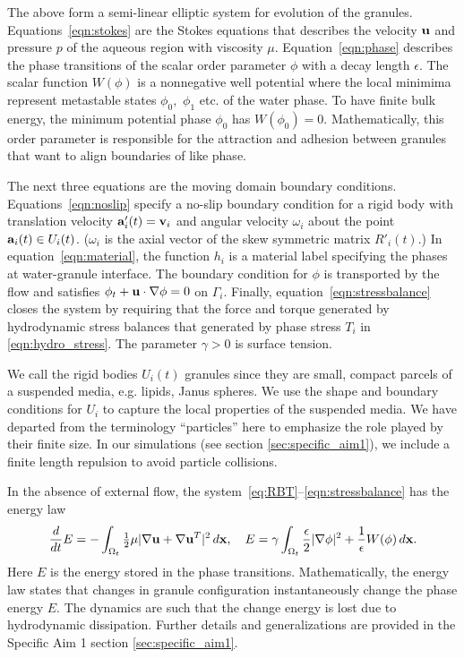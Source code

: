 The above form a semi-linear elliptic 
system for evolution of the granules.  Equations~\eqref{eqn:stokes} are the
Stokes equations that describes the velocity $\uu$ and pressure $p$ of
the aqueous region with viscosity $\mu$.  Equation~\eqref{eqn:phase} describes the
phase transitions of the scalar order parameter $\phi$ with a decay
length $\epsilon$.
The scalar function $W(\phi)$ is a nonnegative
well potential where the local 
minimima represent metastable states $\phi_0,$ $\phi_1$ etc. of the water phase.
To have finite bulk energy, the minimum potential phase
$\phi_0$ has $W(\phi_0) = 0.$
Mathematically, this order parameter is responsible for
the attraction and adhesion between granules that want to align boundaries
of like phase.

The next three equations are the moving domain boundary conditions.
Equations~\eqref{eqn:noslip} specify a no-slip
boundary condition for a rigid body with translation velocity $\aa'_i(t) = \vv_i$
and angular velocity $\omega_i$
about the point $\aa_i(t) \in U_i(t)$.
($\omega_i$ is the axial vector of the
skew symmetric matrix $R'_i(t)$.)
In
equation~\eqref{eqn:material}, the function $h_i$ is a material label
specifying the phases at water-granule interface.
The boundary condition for $\phi$ is transported by the flow
and satisfies $\phi_t + \uu \cdot \nabla \phi = 0$ on $\Gamma_i$.
Finally,
equation~\eqref{eqn:stressbalance} closes the system by
requiring that the force and torque generated by 
hydrodynamic stress balances that generated by phase stress $T_i$ in
\eqref{eqn:hydro_stress}.
The parameter $\gamma > 0$ is surface tension. 

We call the rigid bodies $U_i(t)$ granules since they are small, compact
parcels of a suspended media, e.g. lipids, Janus spheres.
We use the shape and boundary conditions for $U_i$ to capture the local
properties of the suspended media. 
We have departed from the terminology ``particles'' here
to emphasize the role played by their finite size. 
In our simulations (see section \ref{sec:specific_aim1}),
we include a finite length repulsion to avoid particle
collisions.

In the absence of external flow,
the system~\eqref{eq:RBT}--\eqref{eqn:stressbalance}
has the energy law
\begin{equation}
\label{eq:energy_law}
  \frac{d}{dt}E
  = - \int_{\Omega_t}\tfrac{1}{2}\mu|\nabla \uu + \nabla
  \uu^T|^2 \,d\xx,\quad
    E = \gamma \int_{\Omega_t}
  \frac{\epsilon}{2} |\nabla \phi|^2 + \frac{1}{\epsilon} W(\phi) \,d\xx.
\end{equation}
Here $E$ is the energy stored in the phase transitions.
Mathematically, the energy law states that changes
in granule configuration instantaneously change the phase energy $E$.
The dynamics are such that the change energy
is lost due to hydrodynamic dissipation.
Further details and generalizations are provided in
the Specific Aim 1 section \ref{sec:specific_aim1}.


